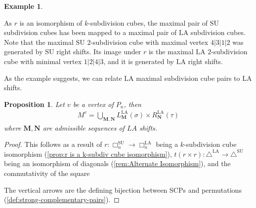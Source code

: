 \documentclass{amsart}
\newcommand{\red}{\color{red}} %
\newtheorem{proposition}[theorem]{Proposition}
\theoremstyle{definition}
\newtheorem{example}[theorem]{Example}
\newcommand{\SU}{\mathrm{SU}}
\newcommand{\LA}{\mathrm{LA}}
\newcommand{\SUD}{\triangle^{\mathrm{SU}}}
\newcommand{\LAD}{\triangle^{\mathrm{LA}}}
\newcommand{\divcube}[1]{\Box_{#1}}
\newcommand{\maxsubdivpairsv}{M^v}
\begin{document}
\begin{example}
\begin{center}
{
}
\end{center}
As $r$ is an isomorphism of $k$-subdivision cubes, the maximal pair of $\SU$ subdivision cubes has been mapped to a maximal pair of $\LA$ subdivision cubes.
Note that the maximal $\SU$ $2$-subdivision cube with maximal vertex $4|3|1|2$ was generated by $\SU$ right shifts.
Its image under $r$ is the maximal $\LA$ $2$-subdivision cube with minimal vertex $1|2|4|3$, and it is generated by $\LA$ right shifts.
\end{example}

As the example suggests, we can relate $\LA$ maximal subdivision cube pairs to $\LA$ shifts.
\begin{proposition}
Let $v$ be a vertex of $P_n$, then
\begin{align*}
    \maxsubdivpairsv = \bigcup_{\mathbf{M},\mathbf{N}} L_\mathbf{M}^{\LA}(\sigma) \times R_{\mathbf{N}}^{\LA}(\tau)
\end{align*}
where $\mathbf{M},\mathbf{N}$ are admissible sequences of $LA$ shifts.
\end{proposition}
\begin{proof}
This follows as a result of $r:\divcube{n}^{\SU}\to \divcube{n}^{\LA}$ being a $k$-subdivision cube isomorphism (\cref{prop:r is a k-subdiv cube isomorphism}), $t(r\times r):\LAD\to \SUD$ being an isomorphism of diagonals (\cref{rem:Alternate Isomorphism}), and the commutativity of the square 
\begin{center}
\end{center}
The vertical arrows are the defining bijection between SCPs and permutations (\cref{def:strong-complementary-pairs}).
\end{proof}
\end{document}
